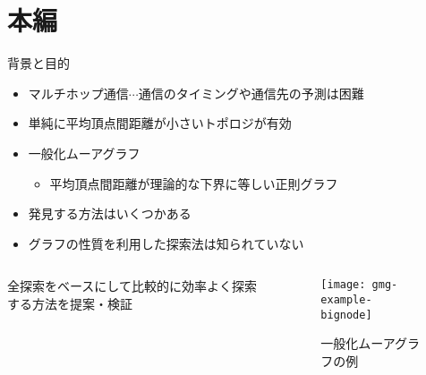 
\begin{frame}
  \maketitle
\end{frame}

\section{本編}
\begin{frame}{背景と目的}
  \begin{itemize}
  \item マルチホップ通信$\cdots$通信のタイミングや通信先の予測は困難
  \item 単純に平均頂点間距離が小さいトポロジが有効
    \cite{Koibuchi2012, Singla2011}
  \item \alert{一般化ムーアグラフ}
    \begin{itemize}
    \item 平均頂点間距離が理論的な下界に等しい正則グラフ
      \cite{cerf1973computer, Cerf1974}
    \end{itemize}
  \item 発見する方法はいくつかある
    \cite{Fujita2015, Yamamoto2016}
  \item グラフの性質を利用した探索法は知られていない
  \end{itemize}
  \begin{columns}[T]
    \begin{column}{.4\textwidth}
      \begin{block}{}
        全探索をベースにして比較的に効率よく探索する方法を提案・検証
      \end{block}
    \end{column}
    \begin{column}{.4\textwidth}
      \begin{figure}
        \texttt{[image: gmg-example-bignode]}
        \caption{一般化ムーアグラフの例}
      \end{figure}
    \end{column}
  \end{columns}
\end{frame}

